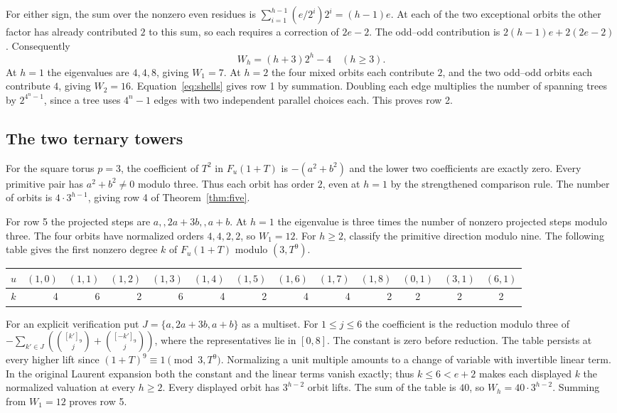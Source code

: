 For either sign, the sum over the nonzero even residues is
$\sum_{i=1}^{h-1}(e/2^i)2^i=(h-1)e$. At each of the two exceptional orbits
the other factor has already contributed $2$ to this sum, so each requires a
correction of $2e-2$. The odd--odd contribution is
$2(h-1)e+2(2e-2)$. Consequently
\[
 W_h=(h+3)2^h-4\quad(h\ge3).
\]
At $h=1$ the eigenvalues are $4,4,8$, giving $W_1=7$.
At $h=2$ the four mixed orbits each contribute $2$, and the two odd--odd
orbits each contribute $4$, giving $W_2=16$. Equation~\eqref{eq:shells}
gives row 1 by summation. Doubling each edge multiplies the number of
spanning trees by $2^{4^n-1}$, since a tree uses $4^n-1$ edges with two
independent parallel choices each. This proves row 2.



\subsection{The two ternary towers}
For the square torus $p=3$, the coefficient of $T^2$ in
$F_u(1+T)$ is $-(a^2+b^2)$ and the lower two coefficients are exactly zero.
Every primitive pair has $a^2+b^2\ne0$ modulo three. Thus each orbit has
order $2$, even at $h=1$ by the strengthened comparison rule. The number
of orbits is $4\cdot3^{h-1}$, giving row 4 of Theorem~\ref{thm:five}.

For row 5 the projected steps are $a,,2a+3b,,a+b$. At $h=1$ the
eigenvalue is three times the number of nonzero projected steps modulo
three. The four orbits have normalized orders $4,4,2,2$, so $W_1=12$.
For $h\ge2$, classify the primitive direction modulo nine. The following
table gives the first nonzero degree $k$ of $F_u(1+T)$ modulo $(3,T^9)$.
\begin{center}\small
\begin{tabular}{c|rrrrrrrrr|ccc}
$u$ & $(1,0)$ & $(1,1)$ & $(1,2)$ & $(1,3)$ & $(1,4)$ & $(1,5)$ &
$(1,6)$ & $(1,7)$ & $(1,8)$ & $(0,1)$ & $(3,1)$ & $(6,1)$\\
\hline
$k$&4&6&2&6&4&2&4&4&2&2&2&2
\end{tabular}
\end{center}
For an explicit verification put $J=\{a,2a+3b,a+b\}$ as a multiset.
For $1\le j\le6$ the coefficient is the reduction modulo three of
$-\sum_{k'\in J}(\binom{[k']_9}{j}+\binom{[-k']_9}{j})$,
where the representatives lie in $[0,8]$. The constant is zero before reduction.
The table persists at every higher lift since
$(1+T)^9\equiv1\pmod{3,T^9}$. Normalizing a unit multiple amounts to a
change of variable with invertible linear term. In the original Laurent
expansion both the constant and the linear terms vanish exactly; thus
$k\le6<e+2$ makes each displayed $k$ the normalized valuation at every
$h\ge2$. Every displayed orbit has $3^{h-2}$ orbit lifts. The sum of the
table is $40$, so $W_h=40\cdot3^{h-2}$. Summing from $W_1=12$ proves row 5.

